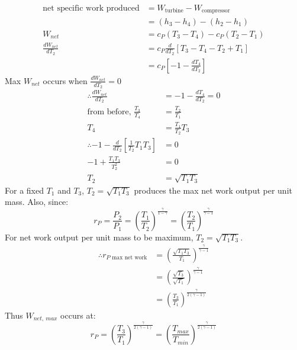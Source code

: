 \begin{align}
  \textrm{net specific work produced} & = W_{\textrm{turbine}} - W_{\textrm{compressor}}          \\
                                      & = (h_3 - h_4) - (h_2 - h_1)                               \\
  W_{net}                             & = c_P (T_3 - T_4) - c_P (T_2 - T_1)                       \\
  \frac{dW_{net}}{dT_2}               & = c_P \frac{d}{dT_2} \left[ T_3 - T_4 - T_2 + T_1 \right] \\
                                      & = c_P \left[ -1 - \frac{dT_4}{dT_2} \right]
\end{align}
Max $W_{net}$ occurs when $\frac{dW_{net}}{dT_2} = 0$
\begin{align}
  \therefore \frac{dW_{net}}{dT_2}                                    & = -1 - \frac{dT_4}{dT_2} = 0 \\
  \textrm{from before, } \frac{T_3}{T_4}                              & = \frac{T_2}{T_1}            \\
  T_4                                                                 & = \frac{T_1}{T_2}T_3         \\
  \therefore -1 - \frac{d}{dT_2} \left[ \frac{1}{T_2} T_1 T_3 \right] & = 0                          \\
  -1 + \frac{T_1 T_3}{T_2^2}                                          & = 0                          \\
  T_2                                                                 & = \sqrt{T_1 T_3}
\end{align}
For a fixed $T_1$ and $T_3$, $T_2 = \sqrt{T_1 T_3}$ produces the max net work output per unit mass. Also, since:
\begin{equation}
  r_P = \frac{P_2}{P_1} = \left( \frac{T_1}{T_2} \right)^{\frac{\gamma}{1- \gamma}} = \left( \frac{T_2}{T_1} \right)^{\frac{\gamma}{\gamma -1}}
\end{equation}
For net work output per unit mass to be maximum, $T_2 = \sqrt{T_1 T_3}$.
\begin{align}
  \therefore r_{P \textrm{ max net work}} & = \left( \frac{\sqrt{T_1 T_3}}{T_1} \right)^{\frac{\gamma}{\gamma -1}}    \\
                                          & = \left( \frac{\sqrt{T_3}}{\sqrt{T_1}} \right)^{\frac{\gamma}{\gamma -1}} \\
                                          & = \left( \frac{T_3}{T_1} \right)^{\frac{\gamma}{2(\gamma -1)}}
\end{align}
Thus $W_{net, \ max}$ occurs at:
\begin{equation}
  r_P = \left( \frac{T_3}{T_1} \right)^{\frac{\gamma}{2(\gamma -1)}} = \left( \frac{T_{max}}{T_{min}} \right)^{\frac{\gamma}{2(\gamma -1)}}
\end{equation}
